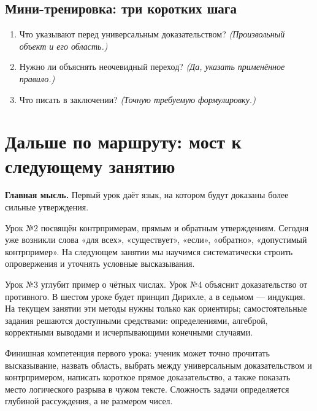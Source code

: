 \documentclass[11pt,a4paper,openany]{book}
\begin{document}
\subsection*{Мини-тренировка: три коротких шага}
\begin{enumerate}[label=\arabic*),leftmargin=*,itemsep=3pt]

\item Что указывают перед универсальным доказательством? \textit{(Произвольный объект и его область.)}

\item Нужно ли объяснять неочевидный переход? \textit{(Да, указать применённое правило.)}

\item Что писать в заключении? \textit{(Точную требуемую формулировку.)}

\end{enumerate}

\medskip

\section{Дальше по маршруту: мост к следующему занятию}\label{theory:13}

\begin{keybox}\textbf{Главная мысль.} Первый урок даёт язык, на котором будут доказаны более сильные утверждения.\end{keybox}

Урок №2 посвящён контрпримерам, прямым и обратным утверждениям. Сегодня уже возникли слова «для всех», «существует», «если», «обратно», «допустимый контрпример». На следующем занятии мы научимся систематически строить опровержения и уточнять условные высказывания.


Урок №3 углубит пример о чётных числах. Урок №4 объяснит доказательство от противного. В шестом уроке будет принцип Дирихле, а в седьмом — индукция. На текущем занятии эти методы нужны только как ориентиры; самостоятельные задания решаются доступными средствами: определениями, алгеброй, корректными выводами и исчерпывающими конечными случаями.


Финишная компетенция первого урока: ученик может точно прочитать высказывание, назвать область, выбрать между универсальным доказательством и контрпримером, написать короткое прямое доказательство, а также показать место логического разрыва в чужом тексте. Сложность задачи определяется глубиной рассуждения, а не размером чисел.
\end{document}
